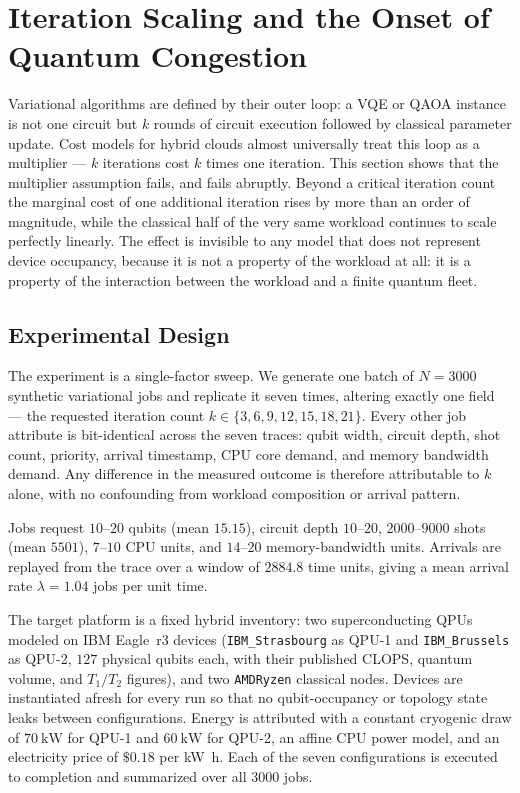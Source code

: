 \section{Iteration Scaling and the Onset of Quantum Congestion}
\label{sec:iteration-scaling}

Variational algorithms are defined by their outer loop: a VQE or QAOA instance
is not one circuit but $k$ rounds of circuit execution followed by classical
parameter update. Cost models for hybrid clouds almost universally treat this
loop as a multiplier --- $k$ iterations cost $k$ times one iteration. This
section shows that the multiplier assumption fails, and fails abruptly. Beyond
a critical iteration count the marginal cost of one additional iteration rises
by more than an order of magnitude, while the classical half of the very same
workload continues to scale perfectly linearly. The effect is invisible to any
model that does not represent device occupancy, because it is not a property of
the workload at all: it is a property of the interaction between the workload
and a finite quantum fleet.

\subsection{Experimental Design}
\label{sec:iter-setup}

The experiment is a single-factor sweep. We generate one batch of
$N=3000$ synthetic variational jobs and replicate it seven times, altering
exactly one field --- the requested iteration count
$k \in \{3,6,9,12,15,18,21\}$. Every other job attribute is bit-identical
across the seven traces: qubit width, circuit depth, shot count, priority,
arrival timestamp, CPU core demand, and memory bandwidth demand. Any difference
in the measured outcome is therefore attributable to $k$ alone, with no
confounding from workload composition or arrival pattern.

Jobs request $10$--$20$ qubits (mean $15.15$), circuit depth $10$--$20$,
$2000$--$9000$ shots (mean $5501$), $7$--$10$ CPU units, and $14$--$20$
memory-bandwidth units. Arrivals are replayed from the trace over a window of
$2884.8$ time units, giving a mean arrival rate
$\lambda = 1.04$ jobs per unit time.

The target platform is a fixed hybrid inventory: two superconducting QPUs
modeled on IBM Eagle~r3 devices (\texttt{IBM\_Strasbourg} as QPU-1 and
\texttt{IBM\_Brussels} as QPU-2, $127$ physical qubits each, with their
published CLOPS, quantum volume, and $T_1/T_2$ figures), and two
\texttt{AMDRyzen} classical nodes. Devices are instantiated afresh for every
run so that no qubit-occupancy or topology state leaks between configurations.
Energy is attributed with a constant cryogenic draw of $\qty{70}{\kilo\watt}$
for QPU-1 and $\qty{60}{\kilo\watt}$ for QPU-2, an affine CPU power model, and
an electricity price of $\$0.18$ per \unit{\kilo\watt\hour}. Each of the seven
configurations is executed to completion and summarized over all $3000$ jobs.

